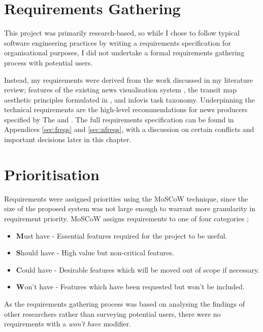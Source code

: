 \section{Requirements Gathering}
This project was primarily research-based, so while I chose to follow typical software engineering practices by writing a requirements specification for organisational purposes, I did not undertake a formal requirements gathering process with potential users.

Instead, my requirements were derived from the work discussed in my literature review; features of the existing news visualisation system \citep{GeneratingInformationMaps}, the transit map aesthetic principles formulated in \citep{AutomaticMetroMapLayoutThesis, AutomaticMetroMapLayout}, and  infovis task taxonomy. Underpinning the technical requirements are the high-level recommendations for news producers specified by The \cite{anewmodelfornews} and \cite{overloadjournalismsbattle}. The full requirements specification can be found in Appendices \ref{sec:freqs} and \ref{sec:nfreqs}, with a discussion on certain conflicts and important decisions later in this chapter.

\section{Prioritisation}
Requirements were assigned priorities using the MoSCoW technique, since the size of the proposed system was not large enough to warrant more granularity in requirement priority. MoSCoW assigns requirements to one of four categories \citep{PrioritizationUsingMoscow};
\begin{itemize}[noitemsep]
	\item\textbf{M}ust have - Essential features required for the project to be useful.
	\item\textbf{S}hould have - High value but non-critical features.
	\item\textbf{C}ould have - Desirable features which will be moved out of scope if necessary.
	\item\textbf{W}on't have - Features which have been requested but won't be included. 
\end{itemize}
As the requirements gathering process was based on analysing the findings of other researchers rather than surveying potential users, there were no requirements with a \textit{won't have} modifier.


